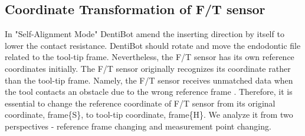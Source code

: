 \subsection*{Coordinate Transformation of F/T sensor}
\label{sec:rfc}
\vspace*{-5mm}
\hspace*{6mm}In "Self-Alignment Mode" DentiBot amend the inserting direction by itself to lower the contact resistance. DentiBot should rotate and move the endodontic file related to the tool-tip frame. Nevertheless, the F/T sensor has its own reference coordinates initially. The F/T sensor originally recognizes its coordinate rather than the tool-tip frame. Namely, the F/T sensor receives unmatched data when the tool contacts an obstacle due to the wrong reference frame \cite{erdogan2014gravity}. Therefore, it is essential to change the reference coordinate of F/T sensor from its original coordinate, frame\{S\}, to tool-tip coordinate, frame\{H\}. We analyze it from two perspectives - reference frame changing and measurement point changing.
